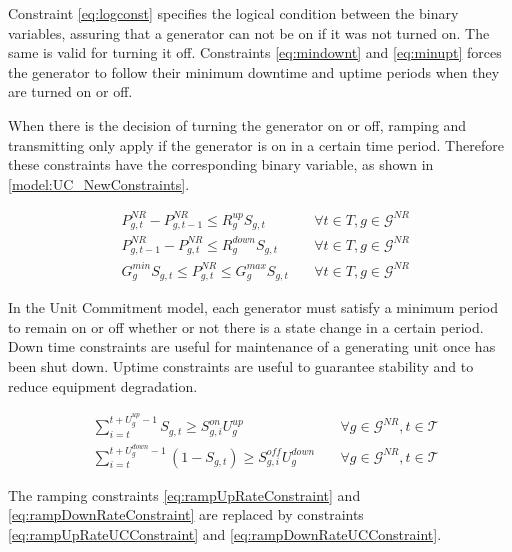 \documentclass[12pt,LUDisStyle,twosided]{book}
\newcommand{\mc}{\mathcal}
\begin{document}
Constraint \eqref{eq:logconst} specifies the logical condition between the binary variables, assuring that a generator can not be on if it was not turned on. The same is valid for turning it off. Constraints \eqref{eq:mindownt} and \eqref{eq:minupt} forces the generator to follow their minimum downtime and uptime periods when they are turned on or off. 

When there is the decision of turning the generator on or off, ramping and transmitting only apply if the generator is on in a certain time period. Therefore these constraints have the corresponding binary variable, as shown in \ref{model:UC_NewConstraints}. %

\begin{subequations}\label{model:UC_NewConstraints}
\begin{alignat}{4}
& P^{NR}_{g,t} - P^{NR}_{g,t - 1} \leq R^{up}_{g} S_{g,t} &~& \forall t \in T, g \in \mc{G}^{NR}\label{eq:UCrampUpRateConstraint} \\
& P^{NR}_{g,t -1 } - P^{NR}_{g,t} \leq R^{down}_{g} S_{g,t} &~& \forall t \in T, g \in \mc{G}^{NR}\label{eq:UCrampDownRateConstraint} \\
& G^{min}_{g} S_{g,t}\leq P^{NR}_{g,t} \leq G^{max}_{g} S_{g,t} &~& \forall t \in T, g \in \mc{G}^{NR}\label{eq:UCgenerationBounds}
\end{alignat} 
\end{subequations}

In the Unit Commitment model, each generator must satisfy a minimum period to remain on or off whether  or not there is a state change in a certain period. Down time constraints are useful for maintenance of a generating unit once has been shut down. Uptime constraints are useful to guarantee stability and to reduce equipment degradation. 

\begin{subequations}\label{model:ucMinDownUpConstraints}
\begin{alignat}{4}
& \sum_{i = t}^{t + U^{up}_{g} - 1} S_{g,t} \geq S^{on}_{g,i} U^{up}_{g} &~& \forall g \in \mc{G}^{NR}, t \in \mc{T} \label{eq:mindownt} \\
& \sum_{i = t}^{t + U^{down}_{g} - 1} (1 -S_{g,t}) \geq S^{off}_{g,i} U^{down}_{g} &~& \forall g \in \mc{G}^{NR}, t \in \mc{T} \label{eq:minupt}
\end{alignat} 
\end{subequations}

The ramping constraints \eqref{eq:rampUpRateConstraint} and \eqref{eq:rampDownRateConstraint} are replaced by constraints \eqref{eq:rampUpRateUCConstraint} and \eqref{eq:rampDownRateUCConstraint}.
\end{document}

